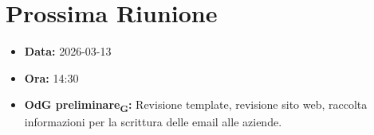 \section{Prossima Riunione}
\begin{itemize}
    \item \textbf{Data:} 2026-03-13
    \item \textbf{Ora:} 14:30
    \item \textbf{OdG preliminare\textsubscript{G}:} Revisione template, revisione sito web, raccolta informazioni per la scrittura delle email alle aziende.
\end{itemize}
